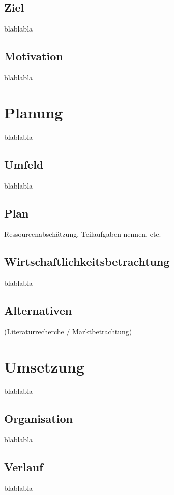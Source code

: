 \subsection{Ziel}
\label{subsec:description:ziel}
blablabla

\subsection{Motivation}
\label{subsec:description:motivation}
blablabla

\section{Planung}
\label{sec:description:planung}
blablabla

\subsection{Umfeld}
\label{subsec:description:umfeld}
blablabla

\subsection{Plan}
\label{subsec:description:plan}
Ressourcenabschätzung, Teilaufgaben nennen, etc.

\subsection{Wirtschaftlichkeitsbetrachtung}
\label{subsec:description:wirtschaftlichkeitsbetrachtung}
blablabla

\subsection{Alternativen}
\label{subsec:description:alternativen}
(Literaturrecherche / Marktbetrachtung)

\section{Umsetzung}
\label{sec:description:umsetzung}
blablabla

\subsection{Organisation}
\label{subsec:description:Organisation}
blablabla

\subsection{Verlauf}
\label{subsec:description:verlauf}
blablabla

